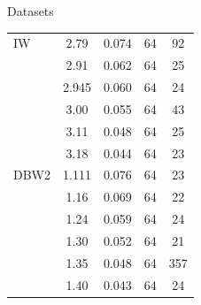 \begin{block}{Datasets}
\begin{minipage}[t]{0.48\textwidth}
\begin{tabular}{lcccc}
        \midrule
            IW  & {\color{coolgreen} 2.79  }  & {\color{coolgreen} 0.074 }   & {\color{coolgreen} 64    } & {\color{coolgreen} 92    } \\
                & {\color{coolgreen} 2.91  }  & {\color{coolgreen} 0.062 }   & {\color{coolgreen} 64    } & {\color{coolgreen} 25    } \\
                & {\color{coolgreen} 2.945 }  & {\color{coolgreen} 0.060 }   & {\color{coolgreen} 64    } & {\color{asparagus} 24    } \\
                & {\color{coolgreen} 3.00  }  & {\color{coolgreen} 0.055 }   & {\color{coolgreen} 64    } & {\color{coolgreen} 43    } \\
                & {\color{coolgreen} 3.11  }  & {\color{coolgreen} 0.048 }   & {\color{coolgreen} 64    } & {\color{coolgreen} 25    } \\
                & {\color{coolgreen} 3.18  }  & {\color{coolgreen} 0.044 }   & {\color{coolgreen} 64    } & {\color{coolgreen} 23    } \\
        \midrule
            DBW2 & {\color{coolgreen} 1.111 } & {\color{coolgreen} 0.076 }        & {\color{coolgreen} 64    }    & {\color{coolgreen} 23    }     \\
                 & {\color{coolgreen} 1.16  } & {\color{coolgreen} 0.069 }        & {\color{coolgreen} 64    }    & {\color{coolgreen} 22    }     \\
                 & {\color{coolgreen} 1.24  } & {\color{coolgreen} 0.059 }        & {\color{coolgreen} 64    }    & {\color{coolgreen} 24    }     \\
                 & {\color{coolgreen} 1.30  } & {\color{coolgreen} 0.052 }        & {\color{coolgreen} 64    }    & {\color{coolgreen} 21    }     \\
                 & {\color{coolgreen} 1.35  } & {\color{coolgreen} 0.048 }        & {\color{coolgreen} 64    }    & {\color{coolgreen} 357   }     \\
                 & {\color{coolgreen} 1.40  } & {\color{coolgreen} 0.043 }        & {\color{coolgreen} 64    }    & {\color{coolgreen} 24    }     \\
        \bottomrule
        \end{tabular}
    \end{minipage}\hfill
    \begin{minipage}[t]{0.48\textwidth}
        \centering
        \setlength{\tabcolsep}{0.55em}
        \renewcommand{\arraystretch}{1.05}
        \begin{tabular}{lcccc}

\end{tabular}
\end{minipage}
\end{block}
